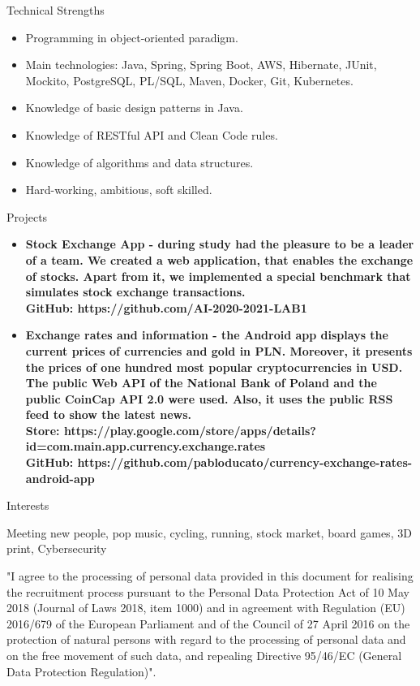 \documentclass{resume}
\begin{document}
\begin{rSection}{Technical Strengths}

\begin{itemize}
    \item Programming in object-oriented paradigm.
    \item Main technologies: Java, Spring, Spring Boot, AWS, Hibernate, JUnit, Mockito, PostgreSQL, PL/SQL, Maven, Docker, Git, Kubernetes.
    \item Knowledge of basic design patterns in Java.
    \item Knowledge of RESTful API and Clean Code rules.
    \item Knowledge of algorithms and data structures.
    \item Hard-working, ambitious, soft skilled.
\end{itemize}

\end{rSection}

\begin{rSection}{Projects}

    \begin{itemize}
        \item \bf Stock Exchange App \normalfont - during study had the pleasure to be a leader of a team.
        We created a web application, that enables the exchange of stocks. Apart from it, we implemented a special benchmark that simulates stock exchange transactions.\\
        GitHub: https://github.com/AI-2020-2021-LAB1
        \item \bf Exchange rates and information \normalfont - the Android app displays the current prices of currencies and gold in PLN.
        Moreover, it presents the prices of one hundred most popular cryptocurrencies in USD.
        The public Web API of the National Bank of Poland and the public CoinCap API 2.0 were used.
        Also, it uses the public RSS feed to show the latest news.\\
        Store: https://play.google.com/store/apps/details?id=com.main.app.currency.exchange.rates \\
        GitHub: https://github.com/pabloducato/currency-exchange-rates-android-app
    \end{itemize}
    
\end{rSection}

\begin{rSection}{Interests}

{Meeting new people, pop music, cycling, running, stock market, board games, 3D print, Cybersecurity}

\end{rSection}

{\footnotesize "I agree to the processing of personal data provided in this document for realising the recruitment process pursuant to the Personal Data
Protection Act of 10 May 2018 (Journal of Laws 2018, item 1000) and in agreement with Regulation (EU) 2016/679 of the European Parliament and of
the Council of 27 April 2016 on the protection of natural persons with regard to the processing of personal data and on the free movement of such
data, and repealing Directive 95/46/EC (General Data Protection Regulation)".}
\end{document}
